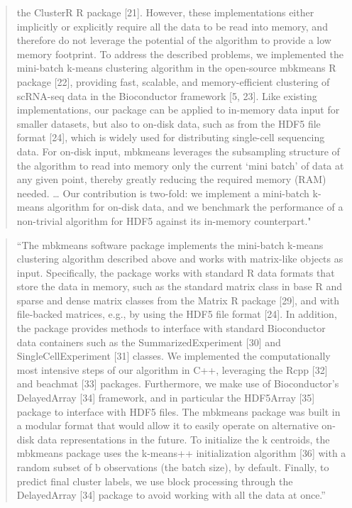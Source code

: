 \documentclass[]{tufte-book}
\begin{document}
\begin{quote}
the ClusterR R package {[}21{]}. However, these implementations either implicitly or
explicitly require all the data to be read into memory, and therefore do not
leverage the potential of the algorithm to provide a low memory footprint. To
address the described problems, we implemented the mini-batch k-means clustering
algorithm in the open-source mbkmeans R package {[}22{]}, providing fast, scalable,
and memory-efficient clustering of scRNA-seq data in the Bioconductor framework
{[}5, 23{]}. Like existing implementations, our package can be applied to in-memory
data input for smaller datasets, but also to on-disk data, such as from the HDF5
file format {[}24{]}, which is widely used for distributing single-cell sequencing
data. For on-disk input, mbkmeans leverages the subsampling structure of the
algorithm to read into memory only the current `mini batch' of data at any given
point, thereby greatly reducing the required memory (RAM) needed. \ldots{} Our
contribution is two-fold: we implement a mini-batch k-means algorithm for
on-disk data, and we benchmark the performance of a non-trivial algorithm for
HDF5 against its in-memory counterpart." \citep{hicks2021mbkmeans}
\end{quote}

\begin{quote}
``The mbkmeans software package implements the mini-batch k-means clustering
algorithm described above and works with matrix-like objects as input.
Specifically, the package works with standard R data formats that store the data
in memory, such as the standard matrix class in base R and sparse and dense
matrix classes from the Matrix R package {[}29{]}, and with file-backed matrices,
e.g., by using the HDF5 file format {[}24{]}. In addition, the package provides
methods to interface with standard Bioconductor data containers such as the
SummarizedExperiment {[}30{]} and SingleCellExperiment {[}31{]} classes. We implemented
the computationally most intensive steps of our algorithm in C++, leveraging the
Rcpp {[}32{]} and beachmat {[}33{]} packages. Furthermore, we make use of Bioconductor's
DelayedArray {[}34{]} framework, and in particular the HDF5Array {[}35{]} package to
interface with HDF5 files. The mbkmeans package was built in a modular format
that would allow it to easily operate on alternative on-disk data
representations in the future. To initialize the k centroids, the mbkmeans
package uses the k-means++ initialization algorithm {[}36{]} with a random subset of
b observations (the batch size), by default. Finally, to predict final cluster
labels, we use block processing through the DelayedArray {[}34{]} package to avoid
working with all the data at once.'' \citep{hicks2021mbkmeans}
\end{quote}
\end{document}
